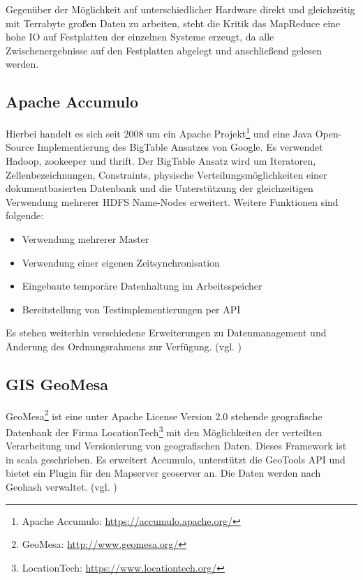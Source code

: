 Gegenüber der Möglichkeit auf unterschiedlicher Hardware direkt und gleichzeitig mit Terrabyte großen Daten zu arbeiten, steht die Kritik das MapReduce eine hohe IO auf Festplatten der einzelnen Systeme erzeugt, da alle Zwischenergebnisse auf den Festplatten abgelegt und anschließend gelesen werden.

\subsection{Apache Accumulo}
\label{accumulo}
Hierbei handelt es sich seit 2008 um ein Apache Projekt\footnote{Apache Accumulo: \url{https://accumulo.apache.org/}} und eine Java Open-Source Implementierung des BigTable Ansatzes von Google.
Es verwendet Hadoop, \Gls{zookeeper} und \Gls{thrift}.
Der BigTable Ansatz wird um Iteratoren, Zellenbezeichnungen, Constraints, physische Verteilungsmöglichkeiten einer dokumentbasierten Datenbank und die Unterstützung der gleichzeitigen Verwendung mehrerer HDFS Name-Nodes erweitert.
Weitere Funktionen sind folgende:
\newpage
\begin{itemize}
\item Verwendung mehrerer Master
\item Verwendung einer eigenen Zeitsynchronisation
\item Eingebaute temporäre Datenhaltung im Arbeitsspeicher
\item Bereitstellung von Testimplementierungen per API
\end {itemize}
Es stehen weiterhin verschiedene Erweiterungen zu Datenmanagement und Änderung des Ordnungsrahmens zur Verfügung. (vgl. \cite{website:accumulo_features})

\subsection{GIS GeoMesa}
GeoMesa\footnote{GeoMesa: \url{http://www.geomesa.org/}} ist eine unter Apache License Version 2.0 stehende geografische Datenbank der Firma LocationTech\footnote{LocationTech: \url{https://www.locationtech.org/}} mit den Möglichkeiten der verteilten Verarbeitung und Versionierung von geografischen Daten.
Dieses Framework ist in \Gls{scala} geschrieben.
Es erweitert Accumulo, unterstützt die GeoTools API und bietet ein Plugin für den Mapserver \Gls{geoserver} an.
Die Daten werden nach Geohash %
verwaltet. (vgl. \cite{website:geomesaeclipse})

